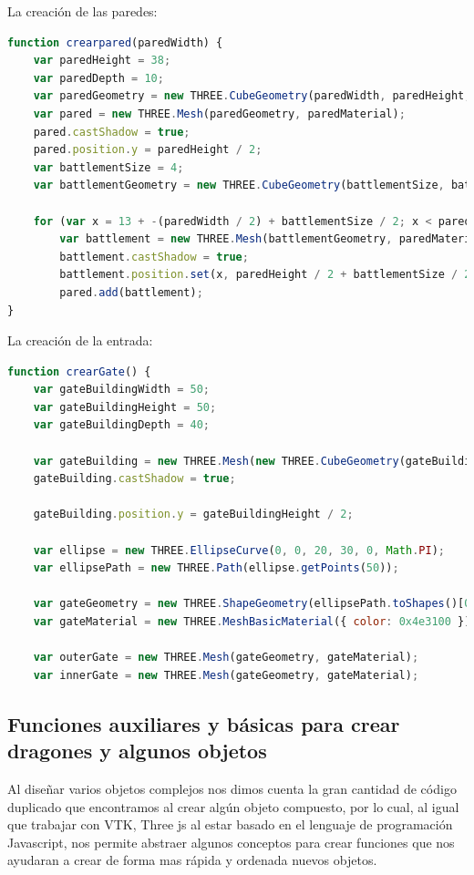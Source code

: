 \documentclass[11pt]{article}
\begin{document}
La creación de las paredes:

\begin{lstlisting}[language=javascript,frame=single]
function crearpared(paredWidth) {
    var paredHeight = 38;
    var paredDepth = 10;
    var paredGeometry = new THREE.CubeGeometry(paredWidth, paredHeight, paredDepth);
    var pared = new THREE.Mesh(paredGeometry, paredMaterial);
    pared.castShadow = true;
    pared.position.y = paredHeight / 2;
    var battlementSize = 4;
    var battlementGeometry = new THREE.CubeGeometry(battlementSize, battlementSize, battlementSize);

    for (var x = 13 + -(paredWidth / 2) + battlementSize / 2; x < paredWidth / 2 - 10; x += battlementSize * 2) {
        var battlement = new THREE.Mesh(battlementGeometry, paredMaterial);
        battlement.castShadow = true;
        battlement.position.set(x, paredHeight / 2 + battlementSize / 2, paredDepth / 2 - battlementSize / 2);
        pared.add(battlement);
}
\end{lstlisting}

La creación de la entrada:

\begin{lstlisting}[language=javascript,frame=single]
function crearGate() {
    var gateBuildingWidth = 50;
    var gateBuildingHeight = 50;
    var gateBuildingDepth = 40;

    var gateBuilding = new THREE.Mesh(new THREE.CubeGeometry(gateBuildingWidth, gateBuildingHeight, gateBuildingDepth), paredMaterial);
    gateBuilding.castShadow = true;

    gateBuilding.position.y = gateBuildingHeight / 2;

    var ellipse = new THREE.EllipseCurve(0, 0, 20, 30, 0, Math.PI);
    var ellipsePath = new THREE.Path(ellipse.getPoints(50));

    var gateGeometry = new THREE.ShapeGeometry(ellipsePath.toShapes()[0]);
    var gateMaterial = new THREE.MeshBasicMaterial({ color: 0x4e3100 });

    var outerGate = new THREE.Mesh(gateGeometry, gateMaterial);
    var innerGate = new THREE.Mesh(gateGeometry, gateMaterial);

\end{lstlisting}


\subsection{Funciones auxiliares y básicas para crear dragones y algunos objetos}
Al diseñar varios objetos complejos nos dimos cuenta la gran cantidad de código duplicado que encontramos al crear algún objeto compuesto, por lo cual, al igual que trabajar con VTK, Three js al estar basado en el lenguaje de programación Javascript, nos permite abstraer algunos conceptos para crear funciones que nos ayudaran a crear de forma mas rápida y ordenada nuevos objetos.\\
\end{document}
